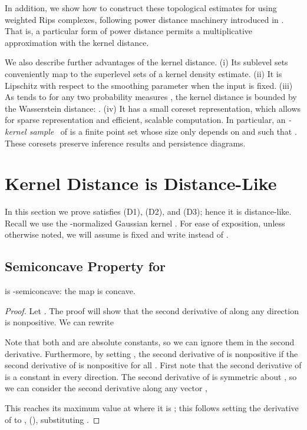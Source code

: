 \documentclass[11pt]{myclass}
\begin{document}
In addition, we show how to construct these topological estimates for  using weighted Rips complexes, following power distance machinery introduced in \cite{BuchetChazalOudot2013}.  That is, a particular form of power distance permits a multiplicative approximation with the kernel distance.  

We also describe further advantages of the kernel distance.  
(i) Its sublevel sets conveniently map to the superlevel sets of a kernel density estimate.  
(ii) It is Lipschitz with respect to the smoothing parameter  when the input  is fixed.  
(iii) As  tends to  for any two probability measures , the kernel distance is bounded by the Wasserstein distance:  .  
(iv) It has a small coreset representation, which allows for sparse representation and efficient, scalable computation.  In particular, an \emph{-kernel sample}~\cite{JoshiKommarajuPhillips2011,Phillips2013,big-kde}  of  is a finite point set whose size only depends on  and such that .  These coresets preserve inference results and persistence diagrams.  


\section{Kernel Distance is Distance-Like} 
\label{sec:prop}

In this section we prove  satisfies (D1), (D2), and (D3); hence it is distance-like.  
Recall we use the -normalized Gaussian kernel .  For ease of exposition, unless otherwise noted, we will assume  is fixed and write  instead of .  




\subsection{Semiconcave Property for }

\begin{lemma}[D2]
 is -semiconcave: the map  is concave. \label{lem:semi}

\end{lemma}
\begin{proof}
Let .  The proof will show that the second derivative of  along any direction is nonpositive.  
We can rewrite 

Note that both  and  are absolute constants, so we can ignore them in the second derivative.  
Furthermore, by setting , the second derivative of  is nonpositive if the second derivative of  is nonpositive for all .  
First note that the second derivative of  is a constant  in every direction.  
The second derivative of  is symmetric about , so we can consider the second derivative along any vector ,

This reaches its maximum value at  where it is ; this follows setting the derivative of  to , (), substituting .  
\end{proof}
\end{document}
